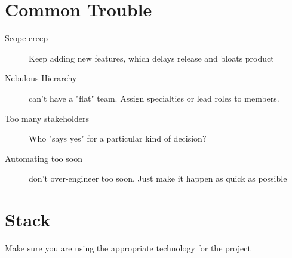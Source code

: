 \documentclass[12pt]{article}
\begin{document}
\section{Common Trouble}
\begin{description}
  \item[Scope creep] Keep adding new features, which delays release and bloats
    product
  \item[Nebulous Hierarchy] can't have a "flat" team. Assign specialties or
    lead roles to members.
  \item[Too many stakeholders] Who "says yes" for a particular kind of decision?
  \item[Automating too soon] don't over-engineer too soon. Just make it happen
    as quick as possible
\end{description}

\section{Stack}
Make sure you are using the appropriate technology for the project
\end{document}
